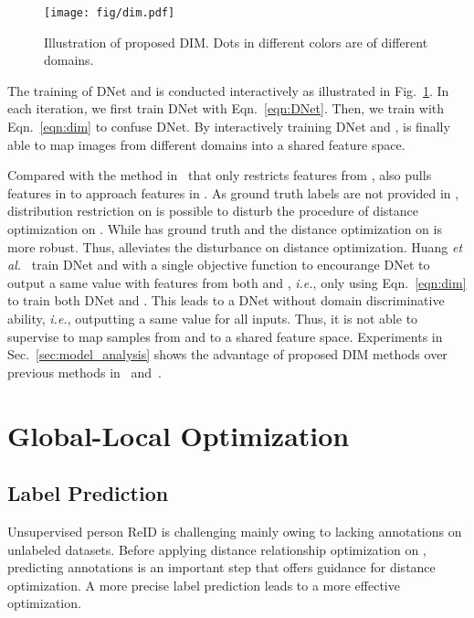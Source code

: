 \documentclass[sigconf]{acmart}
\begin{document}
\begin{figure}[t]
\begin{center}
\texttt{[image: fig/dim.pdf]}
\end{center}
\vspace{-5mm}
\caption{Illustration of proposed DIM. Dots in different colors are of different domains.}
\label{fig:dim}
\vspace{-4mm}
\end{figure}

The training of DNet and  is conducted interactively as illustrated in Fig.~\ref{fig:dim}. In each iteration, we first train DNet with Eqn.~\eqref{eqn:DNet}. Then, we train  with Eqn.~\eqref{eqn:dim} to confuse DNet. By interactively training DNet and ,  is finally able to map images from different domains into a shared feature space.

Compared with the method in~\cite{tzeng2017adversarial} that only restricts features from ,  also pulls features in  to approach features in . As ground truth labels are not provided in , distribution restriction on  is possible to disturb the procedure of distance optimization on . While  has ground truth and the distance optimization on  is more robust. Thus,  alleviates the disturbance on distance optimization. 
Huang \textit{et al.}~\cite{huang2019domain} train DNet and  with a single objective function to encourange DNet to output a same value with features from both  and , \textit{i.e.}, only using Eqn.~\eqref{eqn:dim} to train both DNet and . This leads to a DNet without domain discriminative ability, \textit{i.e.}, outputting a same value for all inputs. Thus, it is not able to supervise  to map samples from  and  to a shared feature space. Experiments in Sec.~\ref{sec:model_analysis} shows the advantage of proposed DIM methods over previous methods in~\cite{tzeng2017adversarial} and~\cite{huang2019domain}.


\section{Global-Local Optimization}
\label{sec:glo}

\subsection{Label Prediction}
Unsupervised person ReID is challenging mainly owing to lacking annotations on unlabeled datasets. Before applying distance relationship optimization on , predicting annotations is an important step that offers guidance for distance optimization. A more precise label prediction leads to a more effective optimization.
\end{document}

